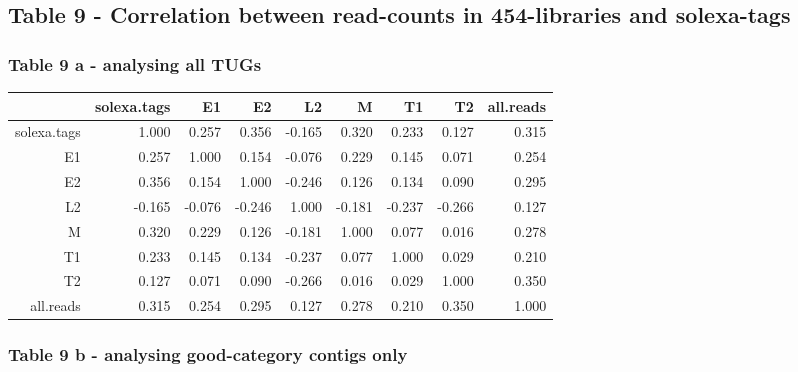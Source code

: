 \documentclass[10pt]{bmc_article}
\newenvironment{bmcformat}{\begin{raggedright}\baselineskip20pt\sloppy\setboolean{publ}{false}}{\end{raggedright}\baselineskip20pt\sloppy}
\begin{document}
\begin{bmcformat}
\subsection*{Table 9 - Correlation between read-counts in
  454-libraries and solexa-tags}

\newpage

\subsubsection*{Table 9 a - analysing all TUGs}

\begin{tabular}{rrrrrrrrr}
  \hline
 & solexa.tags & E1 & E2 & L2 & M & T1 & T2 & all.reads \\ 
  \hline
solexa.tags & 1.000 & 0.257 & 0.356 & -0.165 & 0.320 & 0.233 & 0.127 & 0.315 \\ 
  E1 & 0.257 & 1.000 & 0.154 & -0.076 & 0.229 & 0.145 & 0.071 & 0.254 \\ 
  E2 & 0.356 & 0.154 & 1.000 & -0.246 & 0.126 & 0.134 & 0.090 & 0.295 \\ 
  L2 & -0.165 & -0.076 & -0.246 & 1.000 & -0.181 & -0.237 & -0.266 & 0.127 \\ 
  M & 0.320 & 0.229 & 0.126 & -0.181 & 1.000 & 0.077 & 0.016 & 0.278 \\ 
  T1 & 0.233 & 0.145 & 0.134 & -0.237 & 0.077 & 1.000 & 0.029 & 0.210 \\ 
  T2 & 0.127 & 0.071 & 0.090 & -0.266 & 0.016 & 0.029 & 1.000 & 0.350 \\ 
  all.reads & 0.315 & 0.254 & 0.295 & 0.127 & 0.278 & 0.210 & 0.350 & 1.000 \\ 
   \hline
\end{tabular}\subsubsection*{Table 9 b - analysing good-category contigs only}


\end{bmcformat}
\end{document}
